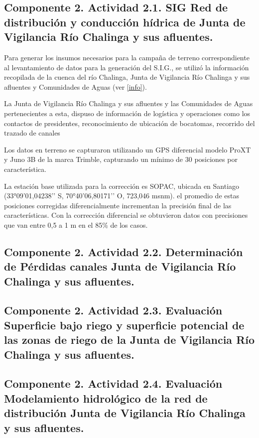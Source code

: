 \documentclass[]{article}
\begin{document}
\subsection{Componente 2. Actividad 2.1. SIG Red de distribución y conducción hídrica de Junta de Vigilancia Río Chalinga y sus afluentes.}

Para generar los insumos necesarios para la campaña de terreno correspondiente al levantamiento de datos para la generación del S.I.G., se utilizó la información recopilada de la cuenca del río Chalinga, Junta de Vigilancia Río Chalinga y sus afluentes y Comunidades de Aguas (ver \ref{info}). 


La Junta de Vigilancia Río Chalinga y sus afluentes y las Comunidades de Aguas pertenecientes a esta, dispuso de información de logística y operaciones como los contactos de presidentes, reconocimiento de ubicación de bocatomas, recorrido del trazado de canales




Los datos en terreno se capturaron utilizando un GPS diferencial modelo ProXT y Juno 3B de la marca Trimble, capturando un mínimo de 30 posiciones por característica.



La estación base utilizada para la corrección es SOPAC, ubicada en Santiago (33°09’01,04238’’ S, 70°40’06,80171’’ O, 723,046 msnm).
 el promedio de estas posiciones corregidas diferencialmente incrementan la precisión final de las características. Con la corrección diferencial se obtuvieron datos con precisiones que van entre 0,5 a 1 m en el 85\% de los casos. 
\clearpage
\subsection{Componente 2. Actividad 2.2. Determinación de Pérdidas canales Junta de Vigilancia Río Chalinga y sus afluentes.}

\clearpage
\subsection{Componente 2. Actividad 2.3. Evaluación Superficie bajo riego y superficie potencial de las zonas de riego de la Junta de Vigilancia Río Chalinga y sus afluentes.}

\clearpage
\subsection{Componente 2. Actividad 2.4. Evaluación Modelamiento hidrológico de la red de distribución Junta de Vigilancia Río Chalinga y sus afluentes.}
\end{document}
